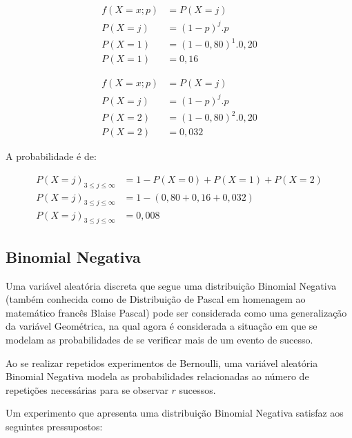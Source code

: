 \documentclass[
]{book}
\begin{document}
\begin{align*}
f(X=x; p) & =  P(X=j) \\
P(X=j) & =  (1-p)^{j} . p \\
P(X=1) & =  (1-0,80)^{1} . 0,20 \\
P(X=1) & =  0,16
\end{align*}

\hfill\break

\begin{align*}
f(X=x; p) & =   P(X=j) \\
P(X=j) & =  (1-p)^{j} . p \\
P(X=2) & =  (1-0,80)^{2} . 0,20 \\
P(X=2) & =  0,032
\end{align*}

\hfill\break

A probabilidade é de:

\begin{align*}
P(X=j)_{3 \le j \le \infty} &  =  1 - P(X=0) + P(X=1) + P(X=2) \\
P(X=j)_{3 \le j \le \infty} &  = 1 - (0,80 + 0,16 + 0,032) \\
P(X=j)_{3 \le j \le \infty} &  = 0,008
\end{align*}

\hypertarget{binomial-negativa}{%
\subsection{Binomial Negativa}\label{binomial-negativa}}

\hfill\break

Uma variável aleatória discreta que segue uma distribuição Binomial Negativa (também conhecida como de Distribuição de Pascal em homenagem ao matemático francês Blaise Pascal) pode ser considerada como uma generalização da variável Geométrica, na qual agora é considerada a situação em que se modelam as probabilidades de se verificar mais de um evento de sucesso.

\hfill\break

Ao se realizar repetidos experimentos de Bernoulli, uma variável aleatória Binomial Negativa modela as probabilidades relacionadas ao número de repetições necessárias para se observar \(r\) sucessos.

\hfill\break

Um experimento que apresenta uma distribuição Binomial Negativa satisfaz aos seguintes pressupostos:

\hfill\break
\end{document}
